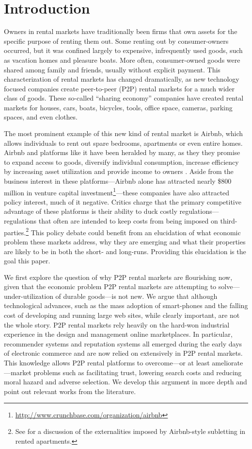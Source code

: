 \documentclass[11pt]{article}
\begin{document}
\section{Introduction}
Owners in rental markets have traditionally been firms that own assets for the specific purpose of renting them out.
Some renting out by consumer-owners occurred, but it was confined largely to expensive, infrequently used goods, such as vacation homes and pleasure boats. 
More often, consumer-owned goods were shared among family and friends, usually without explicit payment. 
This characterization of rental markets has changed dramatically, as new technology focused companies create peer-to-peer (P2P) rental markets for a much wider class of goods. 
These so-called ``sharing economy'' companies have created rental markets for houses, cars, boats, bicycles, tools, office space, cameras, parking spaces, and even clothes. 

The most prominent example of this new kind of rental market is Airbnb, which allows individuals to rent out spare bedrooms, apartments or even entire homes. 
Airbnb and platforms like it have been heralded by many, as they they promise to expand access to goods, diversify individual consumption, increase efficiency by increasing asset utilization and provide income to owners \citep{sundararajan2013zipcar}.
Aside from the business interest in these platforms---Airbnb alone has attracted nearly \$800 million in venture capital investment\footnote{\href{http://www.crunchbase.com/organization/airbnb}{http://www.crunchbase.com/organization/airbnb}}---these companies have also attracted policy interest, much of it negative. 
Critics charge that the primary competitive advantage of these platforms is their ability to duck costly regulations---regulations that often are intended to keep costs from being imposed on third-parties.\footnote{
  See \cite{horton2014tragedy} for a discussion of the externalities imposed by Airbnb-style subletting in rented apartments.
}   
This policy debate could benefit from an elucidation of what economic problem these markets address, why they are emerging and what their properties are likely to be in both the short- and long-runs. 
Providing this elucidation is the goal this paper. 

We first explore the question of why P2P rental markets are flourishing now, given that the economic problem P2P rental markets are attempting to solve---under-utilization of durable goods---is not new.  
We argue that although technological advances, such as the mass adoption of smart-phones and the falling cost of developing and running large web sites, while clearly important, are not the whole story. 
P2P rental markets rely heavily on the hard-won industrial experience in the design and management online marketplaces.
In particular, recommender systems and reputation systems all emerged during the early days of electronic commerce and are now relied on extensively in P2P rental markets.  
This knowledge allows P2P rental platforms to overcome---or at least ameliorate---market problems such as facilitating trust, lowering search costs and reducing moral hazard and adverse selection.  
We develop this argument in more depth and point out relevant works from the literature. 
\end{document}
